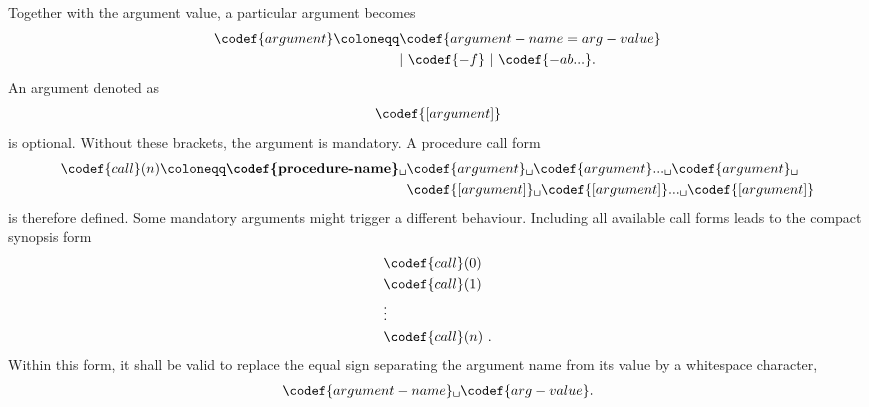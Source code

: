 Together with the argument value, a particular argument becomes
\begin{align*}
  \codef{argument} \coloneqq& \codef{argument-name=arg-value} \\
  &|\ \codef{-f}\ |\ \codef{-ab...}.
\end{align*}
An argument denoted as
\begin{align*}
  \codef{[argument]}
\end{align*}
is optional. Without these brackets, the argument is mandatory. A procedure call form
\begin{align*}
  \codef{call}(n) \coloneqq 
  \textbf{\codef{procedure-name}}\texttt{\textvisiblespace }&
  \codef{argument}\texttt{\textvisiblespace }\codef{argument}...\texttt{\textvisiblespace }\codef{argument}\texttt{\textvisiblespace } \\
  &\codef{[argument]}\texttt{\textvisiblespace }\codef{[argument]}...\texttt{\textvisiblespace }\codef{[argument]}
\end{align*}
is therefore defined. Some mandatory arguments might trigger a different behaviour. Including all available call forms leads to the compact synopsis form
\begin{align*}
  &\codef{call}(0) \\
  &\codef{call}(1) \\
  &\vdots \\
  &\codef{call}(n)\ . \\  
\end{align*}
Within this form, it shall be valid to replace the equal sign separating the argument name from its value by a whitespace character,
\begin{align*}
  \codef{argument-name}\texttt{\textvisiblespace }\codef{arg-value}.
\end{align*}

